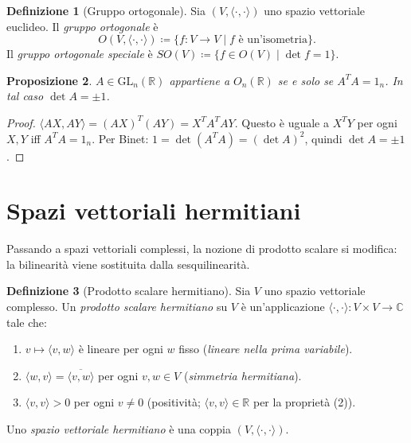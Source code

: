\documentclass[11pt, a4paper]{book}
\theoremstyle{definition}
\newtheorem{definizione}{Definizione}[section]
\theoremstyle{plain}
\newtheorem{proposizione}[definizione]{Proposizione}
\theoremstyle{remark}
\newcommand{\R}{\mathbb{R}}
\newcommand{\C}{\mathbb{C}}
\newcommand{\GL}{\mathrm{GL}}
\begin{document}
\begin{defbox}
\begin{definizione}[Gruppo ortogonale]
\label{def:gruppo-ortogonale}
Sia $(V,\langle\cdot,\cdot\rangle)$ uno spazio vettoriale euclideo. Il \emph{gruppo ortogonale} è
\[
  O(V,\langle\cdot,\cdot\rangle) \coloneqq \{f \colon V \to V \mid f \text{ è un'isometria}\}.
\]
Il \emph{gruppo ortogonale speciale} è $SO(V) \coloneqq \{f \in O(V) \mid \det f = 1\}$.
\end{definizione}
\end{defbox}

\begin{proposizione}
\label{prop:ortogonale-matrice}
$A \in \GL_n(\R)$ appartiene a $O_n(\R)$ se e solo se $A^T A = 1_n$. In tal caso $\det A = \pm 1$.
\end{proposizione}

\begin{proof}
$\langle AX,AY\rangle = (AX)^T(AY) = X^T A^T A Y$. Questo è uguale a $X^T Y$ per ogni $X,Y$ iff $A^T A = 1_n$. Per Binet: $1 = \det(A^T A) = (\det A)^2$, quindi $\det A = \pm 1$.
\end{proof}

\section{Spazi vettoriali hermitiani}
\label{sec:hermitiani}

Passando a spazi vettoriali complessi, la nozione di prodotto scalare si modifica: la bilinearità viene sostituita dalla sesquilinearità.

\begin{defbox}
\begin{definizione}[Prodotto scalare hermitiano]
\label{def:hermitiano}
Sia $V$ uno spazio vettoriale complesso. Un \emph{prodotto scalare hermitiano} su $V$ è un'applicazione $\langle\cdot,\cdot\rangle \colon V \times V \to \C$ tale che:
\begin{enumerate}
  \item $v \mapsto \langle v,w\rangle$ è lineare per ogni $w$ fisso (\emph{lineare nella prima variabile}).
  \item $\langle w,v\rangle = \overline{\langle v,w\rangle}$ per ogni $v,w \in V$ (\emph{simmetria hermitiana}).
  \item $\langle v,v\rangle > 0$ per ogni $v \neq 0$ (positività; $\langle v,v\rangle \in \R$ per la proprietà (2)).
\end{enumerate}
Uno \emph{spazio vettoriale hermitiano} è una coppia $(V,\langle\cdot,\cdot\rangle)$.
\end{definizione}
\end{defbox}
\end{document}
